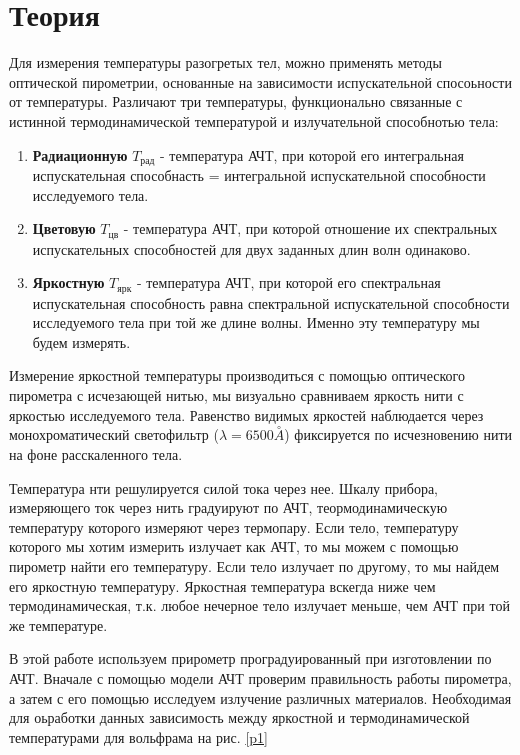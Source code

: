 \documentclass[a4paper]{article}
\begin{document}
\section{Теория}

Для измерения температуры разогретых тел, можно применять методы оптической пирометрии, основанные 
на зависимости испускательной спосоьности от температуры. Различают три температуры, функционально 
связанные с истинной термодинамической температурой и излучательной способнотью тела:

\begin{enumerate}
    \item \textbf{Радиационную} $T_{\text{рад}}$ - температура АЧТ, при которой его интегральная 
    испускательная способнасть = интегральной испускательной способности исследуемого тела.
    \item \textbf{Цветовую} $T_{\text{цв}}$ - температура АЧТ, при которой отношение их спектральных 
    испускательных способностей для двух заданных длин волн одинаково.
    \item \textbf{Яркостную} $T_{\text{ярк}}$ - температура АЧТ, при которой его спектральная испускательная
    способность равна спектральной испускательной способности исследуемого тела при той же длине волны.
    Именно эту температуру мы будем измерять. 
\end{enumerate}

Измерение яркостной температуры производиться с помощью оптического пирометра с исчезающей нитью,
мы визуально сравниваем яркость нити с яркостью исследуемого тела. Равенство  видимых яркостей наблюдается 
через монохроматический светофильтр ($\lambda = 6500 \stackrel{\circ}{A}$) фиксируется по исчезновению
нити на фоне расскаленного тела. \par

Температура нти решулируется силой тока через нее. Шкалу прибора, измеряющего ток через нить градуируют
по АЧТ, теормодинамическую температуру которого измеряют через термопару. Если тело, температуру которого
мы хотим измерить излучает как АЧТ, то мы можем с помощью пирометр найти его температуру. Если тело излучает по другому,
то мы найдем его яркостную температуру. Яркостная температура вскегда ниже чем термодинамическая, т.к. 
любое нечерное тело излучает меньше, чем АЧТ при той же температуре. \par 

В этой работе используем прирометр проградуированный при изготовлении по АЧТ. Вначале с помощью модели АЧТ 
проверим правильность работы пирометра, а затем с его помощью исследуем излучение различных материалов. Необходимая для оьработки 
данных зависимость между яркостной и термодинамической температурами для вольфрама на рис. \ref{p1}
\end{document}
